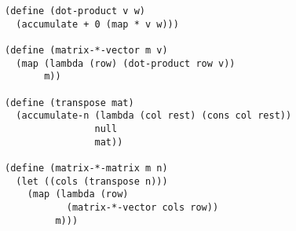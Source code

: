 \documentclass[a4paper,12pt]{article}
\begin{document}
\begin{lstlisting}
(define (dot-product v w)
  (accumulate + 0 (map * v w)))

(define (matrix-*-vector m v)
  (map (lambda (row) (dot-product row v))
       m))

(define (transpose mat)
  (accumulate-n (lambda (col rest) (cons col rest))
                null
                mat))

(define (matrix-*-matrix m n)
  (let ((cols (transpose n)))
    (map (lambda (row)
           (matrix-*-vector cols row))
         m)))
\end{lstlisting}
\end{document}
